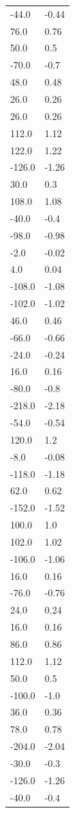 \begin{longtable}{ll}
-44.0 & -0.44 \\
76.0 & 0.76 \\
50.0 & 0.5 \\
-70.0 & -0.7 \\
48.0 & 0.48 \\
26.0 & 0.26 \\
26.0 & 0.26 \\
112.0 & 1.12 \\
122.0 & 1.22 \\
-126.0 & -1.26 \\
30.0 & 0.3 \\
108.0 & 1.08 \\
-40.0 & -0.4 \\
-98.0 & -0.98 \\
-2.0 & -0.02 \\
4.0 & 0.04 \\
-108.0 & -1.08 \\
-102.0 & -1.02 \\
46.0 & 0.46 \\
-66.0 & -0.66 \\
-24.0 & -0.24 \\
16.0 & 0.16 \\
-80.0 & -0.8 \\
-218.0 & -2.18 \\
-54.0 & -0.54 \\
120.0 & 1.2 \\
-8.0 & -0.08 \\
-118.0 & -1.18 \\
62.0 & 0.62 \\
-152.0 & -1.52 \\
100.0 & 1.0 \\
102.0 & 1.02 \\
-106.0 & -1.06 \\
16.0 & 0.16 \\
-76.0 & -0.76 \\
24.0 & 0.24 \\
16.0 & 0.16 \\
86.0 & 0.86 \\
112.0 & 1.12 \\
50.0 & 0.5 \\
-100.0 & -1.0 \\
36.0 & 0.36 \\
78.0 & 0.78 \\
-204.0 & -2.04 \\
-30.0 & -0.3 \\
-126.0 & -1.26 \\
-40.0 & -0.4 \\

\end{longtable}
